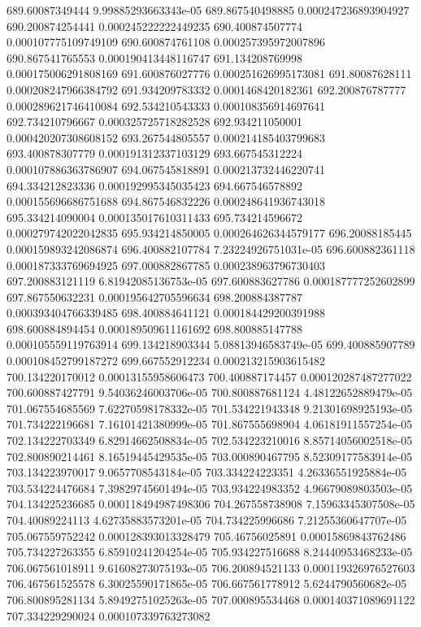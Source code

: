 {689.60087349444 9.99885293663343e-05
689.867540498885 0.000247236893904927
690.200874254441 0.000245222222449235
690.400874507774 0.000107775109749109
690.600874761108 0.000257395972007896
690.867541765553 0.000190413448116747
691.134208769998 0.000175006291808169
691.600876027776 0.000251626995173081
691.80087628111 0.000208247966384792
691.934209783332 0.0001468420182361
692.200876787777 0.000289621746410084
692.534210543333 0.000108356914697641
692.734210796667 0.000325725718282528
692.934211050001 0.000420207308608152
693.267544805557 0.000214185403799683
693.400878307779 0.000191312337103129
693.667545312224 0.000107886363786907
694.067545818891 0.000213732446220741
694.334212823336 0.000192995345035423
694.667546578892 0.000155696686751688
694.867546832226 0.000248641936743018
695.334214090004 0.000135017610311433
695.734214596672 0.000279742022042835
695.934214850005 0.000264626344579177
696.20088185445 0.000159893242086874
696.400882107784 7.23224926751031e-05
696.600882361118 0.000187333769694925
697.000882867785 0.000238963796730403
697.200883121119 6.81942085136753e-05
697.600883627786 0.000187777252602899
697.867550632231 0.000195642705596634
698.200884387787 0.000393404766339485
698.400884641121 0.000184429200391988
698.600884894454 0.000189509611161692
698.800885147788 0.000105559119763914
699.134218903344 5.08813946583749e-05
699.400885907789 0.000108452799187272
699.667552912234 0.000213215903615482
700.134220170012 0.00013155958606473
700.400887174457 0.000120287487277022
700.600887427791 9.54036246003706e-05
700.800887681124 4.48122652889479e-05
701.067554685569 7.62270598178332e-05
701.534221943348 9.21301698925193e-05
701.734222196681 7.16101421380999e-05
701.867555698904 4.06181911557254e-05
702.134222703349 6.82914662508834e-05
702.534223210016 8.85714056002518e-05
702.800890214461 8.16519445429535e-05
703.000890467795 8.52309177583914e-05
703.134223970017 9.0657708543184e-05
703.334224223351 4.26336551925884e-05
703.534224476684 7.39829745601494e-05
703.934224983352 4.96679089803503e-05
704.134225236685 0.000118494987498306
704.267558738908 7.15963345307508e-05
704.40089224113 4.62735883573201e-05
704.734225996686 7.21255360647707e-05
705.067559752242 0.000128393013328479
705.46756025891 0.00015869843762486
705.734227263355 6.85910241204254e-05
705.934227516688 8.24440953468233e-05
706.067561018911 9.61608273075193e-05
706.200894521133 0.000119326976527603
706.467561525578 6.30025590171865e-05
706.667561778912 5.6244790560682e-05
706.800895281134 5.89492751025263e-05
707.000895534468 0.000140371089691122
707.334229290024 0.000107339763273082
}
